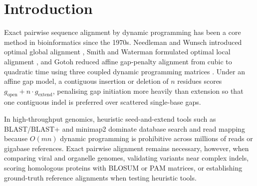 \documentclass[11pt,a4paper]{article}
\begin{document}
\begin{abstract}
\medskip
\noindent\textbf{Conclusions:} Nucleics Align brings exact affine-gap global alignment to megabase-scale DNA in megabytes of RAM and provides fast, dependency-free exact DNA and protein alignment on desktop hardware.

\medskip
\noindent\textbf{Availability:} Source code, C library, CLI tools, Python~3 and Perl interfaces, and reproducible benchmark harnesses are released under the BSD 3-Clause licence at \url{https://github.com/DanielTillett/nucleics-align}.
\end{abstract}

\section{Introduction}

Exact pairwise sequence alignment by dynamic programming has been a core method in bioinformatics since the 1970s. Needleman and Wunsch introduced optimal global alignment \citep{needleman1970general}, Smith and Waterman formulated optimal local alignment \citep{smith1981identification}, and Gotoh reduced affine gap-penalty alignment from cubic to quadratic time using three coupled dynamic programming matrices \citep{gotoh1982improved}. Under an affine gap model, a contiguous insertion or deletion of $n$ residues scores $g_{\text{open}} + n \cdot g_{\text{extend}}$, penalising gap initiation more heavily than extension so that one contiguous indel is preferred over scattered single-base gaps.

In high-throughput genomics, heuristic seed-and-extend tools such as BLAST/BLAST+ \citep{altschul1990blast,camacho2009blastplus} and minimap2 \citep{li2018minimap2} dominate database search and read mapping because $O(mn)$ dynamic programming is prohibitive across millions of reads or gigabase references. Exact pairwise alignment remains necessary, however, when comparing viral and organelle genomes, validating variants near complex indels, scoring homologous proteins with BLOSUM \citep{henikoff1992amino} or PAM \citep{dayhoff1978model} matrices, or establishing ground-truth reference alignments when testing heuristic tools.
\end{document}
